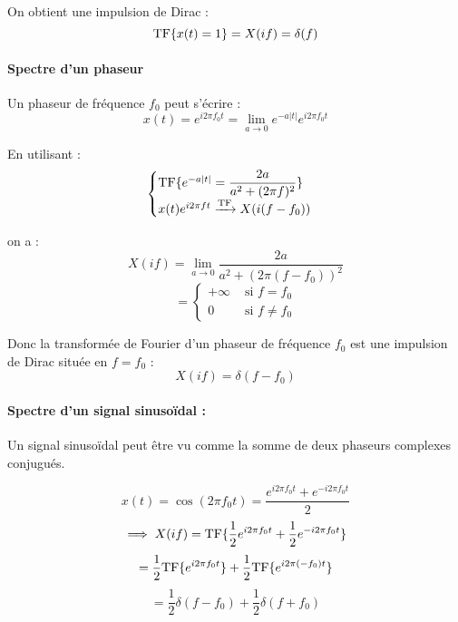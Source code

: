 \documentclass[a4paper,12pt]{article}
\begin{document}
On obtient une impulsion de Dirac :
\[ \mathrm{TF} \{  x(t) = 1 \} = X(if) = \delta(f) \]

\paragraph{Spectre d'un phaseur}

Un phaseur de fréquence $f_0$ peut s'écrire :
\[ x(t) = e^{i2\pi f_0t} = \lim_{a \to 0} e^{-a|t|} e^{i2\pi f_0t} \]

En utilisant :
\[ \begin{cases}
    \mathrm{TF} \{  e^{-a|t|} = \dfrac{2a}{a^2 + (2\pi f)^2} \} \\
    x(t)e^{i2\pi ft} \xrightarrow{\mathrm{TF}} X(i(f-f_0))
\end{cases} \]

on a :
\[ X(if) = \lim_{a \to 0} \dfrac{2a}{a^2 + (2\pi(f-f_0))^2} \]
\[ = \begin{cases}
    +\infty & \text{ si } f = f_0 \\
    0 & \text{ si } f \neq f_0
\end{cases} \]

Donc la transformée de Fourier d'un phaseur de fréquence $f_0$ est une impulsion de Dirac située en $f=f_0$ :
\[ X(if) = \delta(f-f_0) \]

\paragraph{Spectre d'un signal sinusoïdal :}

Un signal sinusoïdal peut être vu comme la somme de deux phaseurs complexes conjugués.

\[ x(t) = \cos(2\pi f_0 t) = \dfrac{e^{i2\pi f_0t} + e^{-i2\pi f_0t}}{2} \]
\[ \implies X(if) = \mathrm{TF} \{  \dfrac{1}{2} e^{i2\pi f_0t} + \dfrac{1}{2} e^{-i2\pi f_0t} \} \]
\[ = \dfrac{1}{2} \mathrm{TF} \{ e^{i2\pi f_0t} \} + \dfrac{1}{2} \mathrm{TF} \{ e^{i2\pi (-f_0)t} \} \]
\[ = \dfrac{1}{2} \delta(f-f_0) + \dfrac{1}{2} \delta(f+f_0) \]
\end{document}
